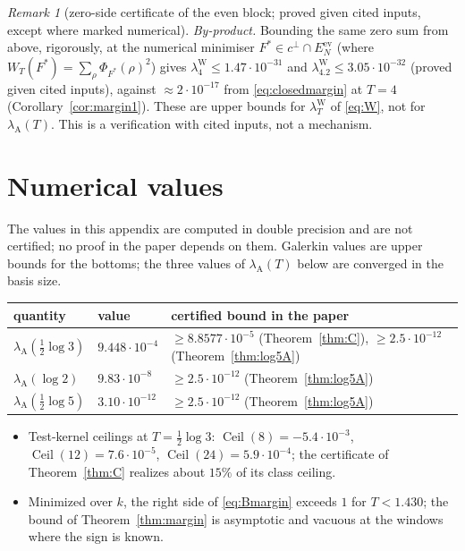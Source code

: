 \documentclass[11pt]{amsart}
\theoremstyle{definition}
\theoremstyle{remark}
\newtheorem{remark}[theorem]{Remark}
\newcommand{\lamW}{\lambda^{\mathrm W}_T}
\newcommand{\lamA}{\lambda_{\mathrm A}(T)}
\begin{document}
\begin{remark}[zero-side certificate of the even block; proved given cited inputs, except where marked numerical]
\emph{By-product.} Bounding the same zero sum from above, rigorously, at the numerical minimiser $F^*\in c^\perp\cap E^{\mathrm{ev}}_N$
(where $W_T(F^*)=\sum_\rho\Phi_{F^*}(\rho)^2$) gives $\lambda^{\mathrm W}_{4}\le1.47\cdot10^{-31}$ and $\lambda^{\mathrm W}_{4.2}\le3.05\cdot10^{-32}$
(proved given cited inputs), against $\approx2\cdot10^{-17}$ from \eqref{eq:closedmargin} at $T=4$
(Corollary~\ref{cor:margin1}). These are upper bounds for $\lamW$ of \eqref{eq:W}, not for $\lamA$. This is a verification with
cited inputs, not a mechanism.
\end{remark}


\section{Numerical values}\label{app:num}

The values in this appendix are computed in double precision and are not certified; no proof in the paper
depends on them. Galerkin values are upper bounds for the bottoms; the three values of $\lamA$ below are
converged in the basis size.

\begin{center}\small
\begin{tabular}{@{}lll@{}}
\toprule
quantity & value & certified bound in the paper\\
\midrule
$\lambda_{\mathrm A}(\frac12\log3)$ & $9.448\cdot10^{-4}$ & $\ge8.8577\cdot10^{-5}$ (Theorem~\ref{thm:C}), $\ge2.5\cdot10^{-12}$ (Theorem~\ref{thm:log5A})\\
$\lambda_{\mathrm A}(\log2)$ & $9.83\cdot10^{-8}$ & $\ge2.5\cdot10^{-12}$ (Theorem~\ref{thm:log5A})\\
$\lambda_{\mathrm A}(\frac12\log5)$ & $3.10\cdot10^{-12}$ & $\ge2.5\cdot10^{-12}$ (Theorem~\ref{thm:log5A})\\
\bottomrule
\end{tabular}
\end{center}

\begin{itemize}
\item Test-kernel ceilings at $T=\frac12\log3$: $\operatorname{Ceil}(8)=-5.4\cdot10^{-3}$,
$\operatorname{Ceil}(12)=7.6\cdot10^{-5}$, $\operatorname{Ceil}(24)=5.9\cdot10^{-4}$; the certificate of
Theorem~\ref{thm:C} realizes about $15\%$ of its class ceiling.
\item Minimized over $k$, the right side of \eqref{eq:Bmargin} exceeds $1$ for $T<1.430$; the bound of
Theorem~\ref{thm:margin} is asymptotic and vacuous at the windows where the sign is known.
\end{itemize}
\end{document}
